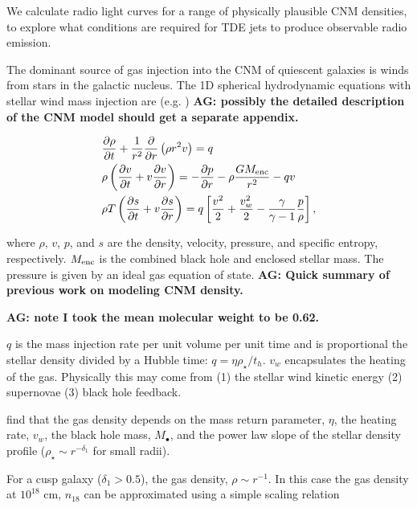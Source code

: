 \documentclass[usenatbib,fleqn]{mn2e}
\newcommand{\Mbh}[1][]{M_{\bullet#1}}
\newcommand{\Menc}{M_{\rm enc}}
\renewcommand{\th}{t_h}
\begin{document}
We calculate radio light curves for a range of physically plausible
CNM densities, to explore what conditions are required for TDE jets to
produce observable radio emission. 

The dominant source of gas injection into the CNM of quiescent
galaxies is winds from stars in the galactic nucleus. The 1D spherical
hydrodynamic equations with stellar wind mass injection are
(e.g. \citealt{Holzer+1970}) {\bf AG: possibly the detailed
  description of the CNM model should get a separate appendix.}


\begin{align}
  &\frac{\partial \rho}{\partial t}+\frac{1}{r^2}\frac{\partial}{\partial r}\left(\rho r^2 v\right)=q \label{eq:drhodt}\\
  &\rho \left(\frac{\partial v}{\partial t} + v\frac{\partial
      v}{\partial r}\right) =-\frac{\partial p}{\partial r}- \rho\frac{GM_{\rm enc}}{r^{2}} -q v \label{eq:dvdt}\\
  &\rho T\left(\frac{\partial s}{\partial t} + v\frac{\partial
      s}{\partial
      r}\right)=q\left[\frac{v^2}{2}+\frac{v_w^2}{2}-\frac{\gamma}{\gamma-1}
    \frac{p}{\rho} \right] ,
\label{eq:dsdt}
\end{align}

where $\rho$, $v$, $p$, and $s$ are the density, velocity, pressure, and
specific entropy, respectively.  $\Menc$ is the combined black hole
and enclosed stellar mass. The pressure is given by an ideal gas
equation of state.  {\bf AG: Quick summary of previous work on
  modeling CNM density.}

 {\bf AG: note I took the mean molecular weight to be
  0.62.}

$q$ is the mass injection rate per unit volume per unit time and is
proportional the stellar density divided by a Hubble time: $q=\eta
\rho_\star/\th$. $v_w$ encapsulates the heating of the gas. Physically
this may come from (1) the stellar wind kinetic energy (2) supernovae
(3) black hole feedback.

\citet{Generozov+2015} find that the gas density depends on the
mass return parameter, $\eta$, the heating rate, $v_w$, the black hole
mass, $\Mbh$, and the power law slope of the stellar density profile
($\rho_\star\sim r^{-\delta_1}$ for small radii).

For a cusp galaxy ($\delta_1> 0.5$), the gas density, $\rho\sim
r^{-1}$. In this case the gas density at $10^{18}$ cm, $n_{18}$ can be
approximated using a simple scaling relation 
\end{document}
